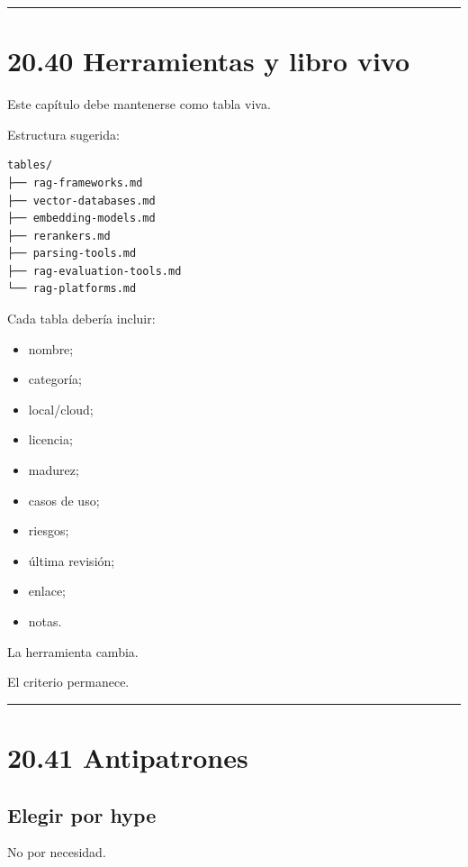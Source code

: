 \begin{center}\rule{0.5\linewidth}{0.5pt}\end{center}

\section{20.40 Herramientas y libro
vivo}\label{herramientas-y-libro-vivo}

Este capítulo debe mantenerse como tabla viva.

Estructura sugerida:

\begin{lstlisting}
tables/
├── rag-frameworks.md
├── vector-databases.md
├── embedding-models.md
├── rerankers.md
├── parsing-tools.md
├── rag-evaluation-tools.md
└── rag-platforms.md
\end{lstlisting}

Cada tabla debería incluir:

\begin{itemize}
\tightlist
\item
  nombre;
\item
  categoría;
\item
  local/cloud;
\item
  licencia;
\item
  madurez;
\item
  casos de uso;
\item
  riesgos;
\item
  última revisión;
\item
  enlace;
\item
  notas.
\end{itemize}

La herramienta cambia.

El criterio permanece.

\begin{center}\rule{0.5\linewidth}{0.5pt}\end{center}

\section{20.41 Antipatrones}\label{antipatrones-9}

\subsection{Elegir por hype}\label{elegir-por-hype-1}

No por necesidad.

